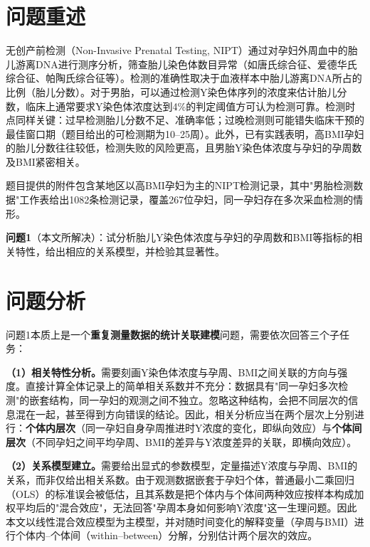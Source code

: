 \documentclass[12pt,a4paper]{ctexart}
\begin{document}
\newpage
\tableofcontents
\newpage

\section{问题重述}

无创产前检测（Non-Invasive Prenatal Testing, NIPT）通过对孕妇外周血中的胎儿游离DNA进行测序分析，筛查胎儿染色体数目异常（如唐氏综合征、爱德华氏综合征、帕陶氏综合征等）。检测的准确性取决于血液样本中胎儿游离DNA所占的比例（胎儿分数）。对于男胎，可以通过检测Y染色体序列的浓度来估计胎儿分数，临床上通常要求Y染色体浓度达到4\%的判定阈值方可认为检测可靠。检测时点同样关键：过早检测胎儿分数不足、准确率低；过晚检测则可能错失临床干预的最佳窗口期（题目给出的可检测期为10--25周）。此外，已有实践表明，高BMI孕妇的胎儿分数往往较低，检测失败的风险更高，且男胎Y染色体浓度与孕妇的孕周数及BMI紧密相关\cite{norton,cnconsensus}。

题目提供的附件包含某地区以高BMI孕妇为主的NIPT检测记录，其中"男胎检测数据"工作表给出1082条检测记录，覆盖267位孕妇，同一孕妇存在多次采血检测的情形。

\textbf{问题1}（本文所解决）：试分析胎儿Y染色体浓度与孕妇的孕周数和BMI等指标的相关特性，给出相应的关系模型，并检验其显著性。

\section{问题分析}

问题1本质上是一个\textbf{重复测量数据的统计关联建模}问题，需要依次回答三个子任务：

\textbf{（1）相关特性分析。}需要刻画Y染色体浓度与孕周、BMI之间关联的方向与强度。直接计算全体记录上的简单相关系数并不充分：数据具有"同一孕妇多次检测"的嵌套结构，同一孕妇的观测之间不独立。忽略这种结构，会把不同层次的信息混在一起，甚至得到方向错误的结论。因此，相关分析应当在两个层次上分别进行：\textbf{个体内层次}（同一孕妇自身孕周推进时Y浓度的变化，即纵向效应）与\textbf{个体间层次}（不同孕妇之间平均孕周、BMI的差异与Y浓度差异的关联，即横向效应）。

\textbf{（2）关系模型建立。}需要给出显式的参数模型，定量描述Y浓度与孕周、BMI的关系，而非仅给出相关系数。由于观测数据嵌套于孕妇个体，普通最小二乘回归（OLS）的标准误会被低估，且其系数是把个体内与个体间两种效应按样本构成加权平均后的"混合效应"，无法回答"孕周本身如何影响Y浓度"这一生理问题。因此本文以线性混合效应模型为主模型，并对随时间变化的解释变量（孕周与BMI）进行个体内--个体间（within--between）分解，分别估计两个层次的效应。
\end{document}
